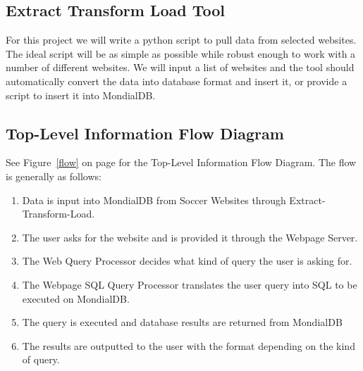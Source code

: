 \documentclass{article}
\begin{document}
\subsection{Extract Transform Load Tool} 
For this project we will write a python script to pull data from selected websites. The ideal script will be as simple as possible while robust enough to work with a number of different websites. We will input a list of websites and the tool should automatically convert the data into database format and insert it, or provide a script to insert it into MondialDB.

\subsection{Top-Level Information Flow Diagram}
See Figure~\ref{flow} on page \pageref{flow} for the Top-Level Information Flow Diagram. The flow is generally as follows:

\begin{enumerate}
\item Data is input into MondialDB from Soccer Websites through Extract-Transform-Load. 
\item The user asks for the website and is provided it through the Webpage Server.
\item The Web Query Processor decides what kind of query the user is asking for.
\item The Webpage SQL Query Processor translates the user query into SQL to be executed on MondialDB.
\item The query is executed and database results are returned from MondialDB
\item The results are outputted to the user with the format depending on the kind of query.
\end{enumerate}
\end{document}
